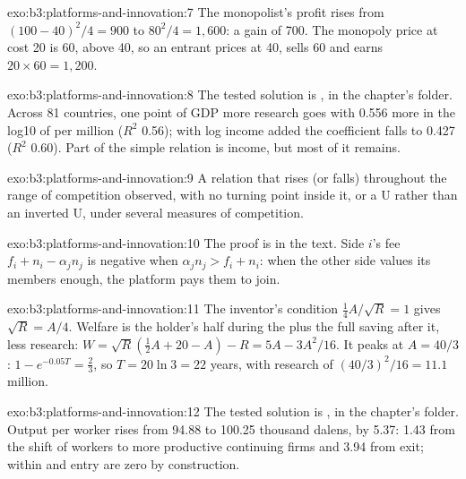 \begin{solution}{exo:b3:platforms-and-innovation:7}
The monopolist's profit rises from $(100 - 40)^2/4 = 900$ to $80^2/4 = 1{,}600$: a gain of 700. The monopoly price at cost 20 is 60,
above 40, so an entrant prices at 40, sells 60 and earns $20 \times 60 = 1{,}200$.
\end{solution}

\begin{solution}{exo:b3:platforms-and-innovation:8}
The tested solution is , in the chapter's 
folder. Across 81 countries, one point of GDP more research goes with 0.556 more in the log10 of
 per million ($R^2$ 0.56); with log income added the coefficient falls to 0.427 ($R^2$ 0.60). Part of
the simple relation is income, but most of it remains. %
\end{solution}

\begin{solution}{exo:b3:platforms-and-innovation:9}
A relation that rises (or falls) throughout the range of competition observed, with
no turning point inside it, or a U rather than an inverted U, under several measures
of competition.
\end{solution}

\begin{solution}{exo:b3:platforms-and-innovation:10}
The proof is in the text. Side $i$'s fee $f_i + n_i - \alpha_j n_j$ is negative when $\alpha_j n_j > f_i + n_i$: when the other side values
its members enough, the platform pays them to join.
\end{solution}

\begin{solution}{exo:b3:platforms-and-innovation:11}
The inventor's condition $\tfrac14 A/\sqrt R = 1$ gives $\sqrt R = A/4$. Welfare is the holder's half during the 
plus the full saving after it, less research: $W = \sqrt R(\tfrac12 A + 20 - A) - R = 5A - 3A^2/16$. It peaks at $A = 40/3$: $1 - e^{-0.05T} = \tfrac23$, so
$T = 20\ln 3 = 22$ years, with research of $(40/3)^2/16 = 11.1$ million.
\end{solution}

\begin{solution}{exo:b3:platforms-and-innovation:12}
The tested solution is , in the chapter's 
folder. Output per worker rises from 94.88 to 100.25 thousand dalens, by 5.37: 1.43 from the shift of
workers to more productive continuing firms and 3.94 from exit; within and entry are zero
by construction. %
\end{solution}

